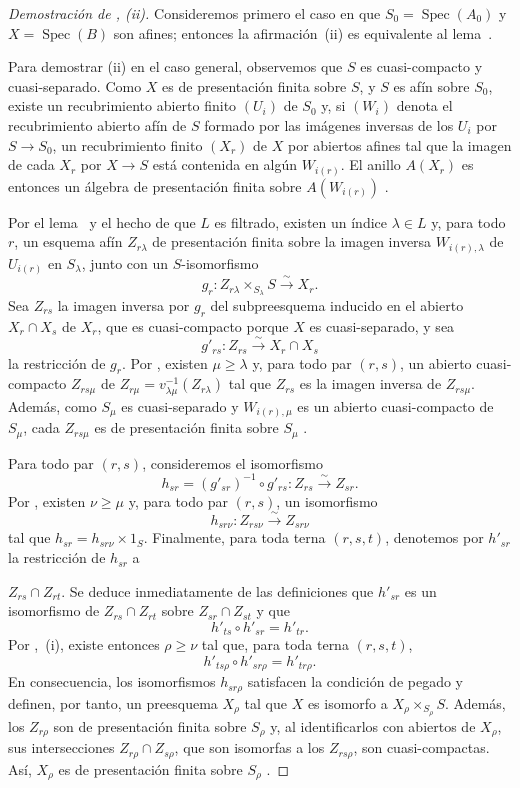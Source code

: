 \begin{proof}[Demostración de , (ii)]
Consideremos primero el caso en que $S_0=\operatorname{Spec}(A_0)$ y $X=\operatorname{Spec}(B)$ son afines; entonces la afirmación~(ii) es equivalente al lema~.

Para demostrar (ii) en el caso general, observemos que $S$ es cuasi-compacto y cuasi-separado. Como $X$ es de presentación finita sobre $S$, y $S$ es afín sobre $S_0$, existe un recubrimiento abierto finito $(U_i)$ de $S_0$ y, si $(W_i)$ denota el recubrimiento abierto afín de $S$ formado por las imágenes inversas de los $U_i$ por $S\to S_0$, un recubrimiento finito $(X_r)$ de $X$ por abiertos afines tal que la imagen de cada $X_r$ por $X\to S$ está contenida en algún $W_{i(r)}$. El anillo $A(X_r)$ es entonces un álgebra de presentación finita sobre $A(W_{i(r)})$ .

Por el lema~ y el hecho de que $L$ es filtrado, existen un índice $\lambda\in L$ y, para todo $r$, un esquema afín $Z_{r\lambda}$ de presentación finita sobre la imagen inversa $W_{i(r),\lambda}$ de $U_{i(r)}$ en $S_\lambda$, junto con un $S$-isomorfismo
\[
 g_r:Z_{r\lambda}\times_{S_\lambda}S\xrightarrow{\sim}X_r.
\]
Sea $Z_{rs}$ la imagen inversa por $g_r$ del subpreesquema inducido en el abierto $X_r\cap X_s$ de $X_r$, que es cuasi-compacto porque $X$ es cuasi-separado, y sea
\[
 g'_{rs}:Z_{rs}\xrightarrow{\sim}X_r\cap X_s
\]
la restricción de $g_r$. Por , existen $\mu\geqslant\lambda$ y, para todo par $(r,s)$, un abierto cuasi-compacto $Z_{rs\mu}$ de $Z_{r\mu}=v_{\lambda\mu}^{-1}(Z_{r\lambda})$ tal que $Z_{rs}$ es la imagen inversa de $Z_{rs\mu}$. Además, como $S_\mu$ es cuasi-separado y $W_{i(r),\mu}$ es un abierto cuasi-compacto de $S_\mu$, cada $Z_{rs\mu}$ es de presentación finita sobre $S_\mu$ .

Para todo par $(r,s)$, consideremos el isomorfismo
\[
 h_{sr}=(g'_{sr})^{-1}\circ g'_{rs}:Z_{rs}\xrightarrow{\sim}Z_{sr}.
\]
Por , existen $\nu\geqslant\mu$ y, para todo par $(r,s)$, un isomorfismo
\[
 h_{sr\nu}:Z_{rs\nu}\xrightarrow{\sim}Z_{sr\nu}
\]
tal que $h_{sr}=h_{sr\nu}\times 1_S$. Finalmente, para toda terna $(r,s,t)$, denotemos por $h'_{sr}$ la restricción de $h_{sr}$ a


$Z_{rs}\cap Z_{rt}$. Se deduce inmediatamente de las definiciones que $h'_{sr}$ es un isomorfismo de $Z_{rs}\cap Z_{rt}$ sobre $Z_{sr}\cap Z_{st}$ y que
\[
 h'_{ts}\circ h'_{sr}=h'_{tr}.
\]
Por ,~(i), existe entonces $\rho\geqslant\nu$ tal que, para toda terna $(r,s,t)$,
\[
 h'_{ts\rho}\circ h'_{sr\rho}=h'_{tr\rho}.
\]
En consecuencia, los isomorfismos $h_{sr\rho}$ satisfacen la condición de pegado  y definen, por tanto, un preesquema $X_\rho$ tal que $X$ es isomorfo a $X_\rho\times_{S_\rho}S$. Además, los $Z_{r\rho}$ son de presentación finita sobre $S_\rho$ y, al identificarlos con abiertos de $X_\rho$, sus intersecciones $Z_{r\rho}\cap Z_{s\rho}$, que son isomorfas a los $Z_{rs\rho}$, son cuasi-compactas. Así, $X_\rho$ es de presentación finita sobre $S_\rho$ .
\end{proof}

